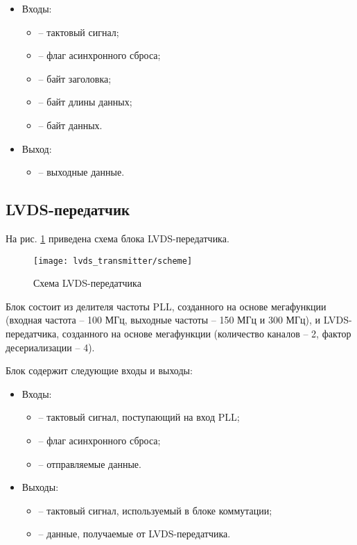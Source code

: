 \begin{itemize}
	\item Входы:
	\begin{itemize}
		\item {} -- тактовый сигнал;
		\item {} -- флаг асинхронного сброса;
		\item {} -- байт заголовка;
		\item {} -- байт длины данных;
		\item {} -- байт данных.
	\end{itemize}
	\item Выход:
	\begin{itemize}
		\item {} -- выходные данные.
	\end{itemize}
\end{itemize}

\newpage

\subsection{LVDS-передатчик}

На рис. \ref{fig:lvds-transmitter-scheme} приведена схема блока LVDS-передатчика. 
\begin{figure}[H]
	\centering
	\texttt{[image: lvds\_transmitter/scheme]}
	\caption{Схема LVDS-передатчика}
	\label{fig:lvds-transmitter-scheme}
\end{figure}

Блок состоит из делителя частоты PLL, созданного на основе мегафункции  (входная частота -- 100 МГц, выходные частоты -- 150 МГц и 300 МГц), и LVDS-передатчика, созданного на основе мегафункции  (количество каналов -- 2, фактор десериализации -- 4). 

Блок содержит следующие входы и выходы:

\begin{itemize}
	\item Входы:
		\begin{itemize}
			\item {} -- тактовый сигнал, поступающий на вход PLL;
			\item {} -- флаг асинхронного сброса;
			\item {} -- отправляемые данные.
		\end{itemize}
	\item Выходы:
		\begin{itemize}
			\item {} -- тактовый сигнал, используемый в блоке коммутации;
			\item {} -- данные, получаемые от LVDS-передатчика. 
		\end{itemize}
\end{itemize}

